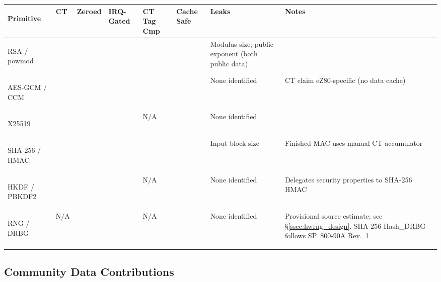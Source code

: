 \documentclass[titlepage]{report}
\renewcommand{\arraystretch}{1.5}
\begin{document}
	\renewcommand{\arraystretch}{1.4}
	\begin{xltabular}{\textwidth}{@{}>{\bfseries\footnotesize\raggedright\arraybackslash}p{0.13\textwidth}
		>{\centering\footnotesize\arraybackslash}p{0.09\textwidth}
		>{\centering\footnotesize\arraybackslash}p{0.09\textwidth}
		>{\centering\footnotesize\arraybackslash}p{0.09\textwidth}
		>{\centering\footnotesize\arraybackslash}p{0.09\textwidth}
		>{\centering\footnotesize\arraybackslash}p{0.09\textwidth}
		>{\footnotesize\raggedright\arraybackslash}p{0.15\textwidth}
		>{\footnotesize\raggedright\arraybackslash}p{0.15\textwidth}@{}}
		\toprule
		\textbf{Primitive}
			& \textbf{CT}
			& \textbf{Zeroed}
			& \textbf{IRQ-Gated}
			& \textbf{CT Tag Cmp}
			& \textbf{Cache Safe}
			& \textbf{Leaks}
			& \textbf{Notes} \\
		\midrule
		\endfirsthead

		RSA / powmod
			& \unk
			& \yes
			& \yes
			& \yes
			& \yes
			& Modulus size; public exponent (both public data)
			& \\
		\addlinespace

		AES-GCM / CCM
			& \yes
			& \yes
			& \yes
			& \yes
			& \yes
			& None identified
			& CT claim eZ80-specific (no data cache) \\
		\addlinespace

		X25519
			& \yes
			& \yes
			& \yes
			& N/A
			& \yes
			& None identified
			& \\
		\addlinespace

		SHA-256 / HMAC
			& \yes
			& \yes
			& \yes
			& \yes
			& \yes
			& Input block size
			& Finished MAC uses manual CT accumulator \\
		\addlinespace

		HKDF / PBKDF2
			& \yes
			& \yes
			& \yes
			& N/A
			& \yes
			& None identified
			& Delegates security properties to SHA-256 HMAC \\
		\addlinespace

		RNG / DRBG
			& N/A
			& \yes
			& \yes
			& N/A
			& \yes
			& None identified
			& Provisional source estimate; see \S\ref{ssec:hwrng_design}. SHA-256 Hash\_DRBG follows SP~800-90A Rev.~1 \\
		\addlinespace

		\bottomrule
	\end{xltabular}

	\newpage

	\subsection{Community Data Contributions}
	\label{ssec:contributing_data}
\end{document}
